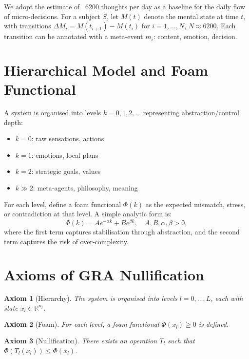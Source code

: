 \documentclass[12pt,a4paper]{article}
\newtheorem{axiom}{Axiom}
\begin{document}
We adopt the estimate of ~6200 thoughts per day as a baseline for the daily flow of micro-decisions. For a subject $S$, let $M(t)$ denote the mental state at time $t$, with transitions $\Delta M_i = M(t_{i+1}) - M(t_i)$ for $i=1,\dots,N$, $N \approx 6200$. Each transition can be annotated with a meta-event $m_i$: content, emotion, decision.

\section{Hierarchical Model and Foam Functional}

A system is organised into levels $k = 0, 1, 2, \dots$ representing abstraction/control depth:
\begin{itemize}
\item $k=0$: raw sensations, actions
\item $k=1$: emotions, local plans
\item $k=2$: strategic goals, values
\item $k \gg 2$: meta‑agents, philosophy, meaning
\end{itemize}

For each level, define a foam functional $\Phi(k)$ as the expected mismatch, stress, or contradiction at that level. A simple analytic form is:
\begin{equation}
\Phi(k) = A e^{-\alpha k} + B e^{\beta k}, \quad A,B,\alpha,\beta > 0,
\end{equation}
where the first term captures stabilisation through abstraction, and the second term captures the risk of over-complexity.

\section{Axioms of GRA Nullification}

\begin{axiom}[Hierarchy]
The system is organised into levels $l=0,\dots,L$, each with state $x_l \in \mathbb{R}^{n_l}$.
\end{axiom}

\begin{axiom}[Foam]
For each level, a foam functional $\Phi(x_l) \ge 0$ is defined.
\end{axiom}

\begin{axiom}[Nullification]
There exists an operation $T_l$ such that $\Phi(T_l(x_l)) \le \Phi(x_l)$.
\end{axiom}
\end{document}

